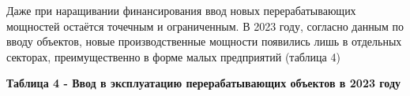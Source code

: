 Даже при наращивании финансирования ввод новых перерабатывающих
мощностей остаётся точечным и ограниченным. В 2023 году, согласно данным
по вводу объектов, новые производственные мощности появились лишь в
отдельных секторах, преимущественно в форме малых предприятий (таблица
4)

{\bfseries Таблица 4 - Ввод в эксплуатацию перерабатывающих объектов в 2023
году}


